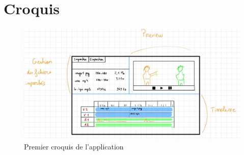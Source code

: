 \documentclass{rapport}
\begin{document}
\section{Croquis}
\begin{figure}[h]
    \centering
    \includegraphics[width=1\textwidth]{croquis_v0.jpg}
    \caption{Premier croquis de l'application}
    \label{fig:croquis}
\end{figure}
\end{document}
